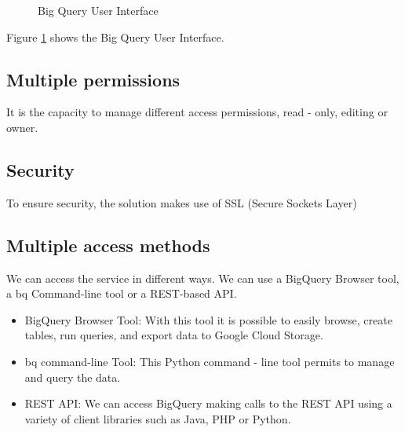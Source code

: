 \documentclass[9pt,twocolumn,twoside]{../../styles/osajnl}
\begin{document}
\begin{figure}[htbp]
\centering
{}
\caption{\cite{www-userinterface-bigquery} Big Query User Interface}
\label{fig:bigqueryinterface}
\end{figure}

Figure \ref{fig:bigqueryinterface} shows the Big Query User Interface.

\subsection{Multiple permissions}
It is the capacity to manage different access permissions, read -
only, editing or owner.

\subsection{Security}
To ensure security, the solution makes use of SSL (Secure Sockets Layer)

\subsection{Multiple access methods}
We can access the service in different ways. We can use a BigQuery
Browser tool, a bq Command-line tool or a REST-based
API. \begin{itemize}
\item BigQuery Browser Tool: With this tool it is possible to easily browse,
create tables, run queries, and export data to Google Cloud Storage.
\item bq command-line Tool: This Python command - line tool permits
  to manage and query the data. \item REST API: We can access BigQuery
  making calls to the REST API using a variety of client libraries
  such as Java, PHP or Python.  \end{itemize}
\end{document}
